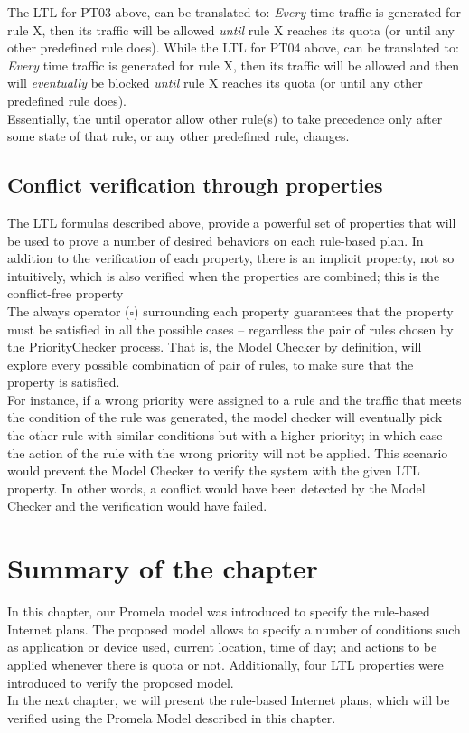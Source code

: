 The LTL for PT03 above, can be translated to: \emph{Every} time traffic is generated for rule X, then its traffic will be allowed \emph{until} rule X reaches its quota (or until any other predefined rule does). While the LTL for PT04 above, can be translated to: \emph{Every} time traffic is generated for rule X, then its traffic will be allowed and then will \emph{eventually} be blocked \emph{until} rule X reaches its quota (or until any other predefined rule does). \\

Essentially, the until operator allow other rule(s) to take precedence only after some state of that rule, or any other predefined rule, changes. \\

\subsection{Conflict verification through properties}
\noindent
The LTL formulas described above, provide a powerful set of properties that will be used to prove a number of desired behaviors on each rule-based plan. In addition to the verification of each property, there is an implicit property, not so intuitively, which is also verified when the properties are combined; this is the conflict-free property\\

The always operator ($\square$) surrounding each property guarantees that the property must be satisfied in all the possible cases -- regardless the pair of rules chosen by the PriorityChecker process. That is, the Model Checker by definition, will explore every possible combination of pair of rules, to make sure that the property is satisfied. \\

For instance, if a wrong priority were assigned to a rule and the traffic that meets the condition of the rule was generated, the model checker will eventually pick the other rule with similar conditions but with a higher priority; in which case the action of the rule with the wrong priority will not be applied. This scenario would prevent the Model Checker to verify the system with the given LTL property. In other words, a conflict would have been detected by the Model Checker and the verification would have failed. 

\section{Summary of the chapter}
\noindent
In this chapter, our Promela model was introduced to specify the rule-based Internet plans. The proposed model allows to specify a number of conditions such as application or device used, current location, time of day; and actions to be applied whenever there is quota or not. Additionally, four LTL properties were introduced to verify the proposed model. \\

In the next chapter, we will present the rule-based Internet plans, which will be verified using the Promela Model described in this chapter.

\clearpage